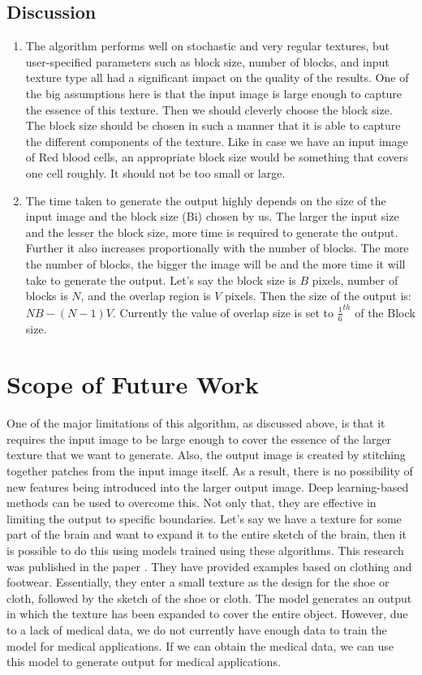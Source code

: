 \documentclass[12pt,a4paper]{report}
\begin{document}
\section{Discussion}
\begin{enumerate}
  \item The algorithm performs well on stochastic and very regular textures, but user-specified parameters such as block size, number of blocks, and input texture type all had a significant impact on the quality of the results. One of the big assumptions here is that the input image is large enough to capture the essence of this texture. Then we should cleverly choose the block size. The block size should be chosen in such a manner that it is able to capture the different components of the texture. Like in case we have an input image of Red blood cells, an appropriate block size would be something that covers one cell roughly. It should not be too small or large.
  \item The time taken to generate the output highly depends on the size of the input image and the block size (Bi) chosen by us. The larger the input size and the lesser the block size, more time is required to generate the output. Further it also increases proportionally with the number of blocks. The more the number of blocks, the bigger the image will be and the more time it will take to generate the output. Let's say the block size is $B$ pixels, number of blocks is $N$, and the overlap region is $V$ pixels. Then the size of the output is: $NB - (N-1)V$. Currently the value of overlap size is set to $\frac{1}{6}^{th}$ of the Block size.
\end{enumerate}


\chapter{Scope of Future Work}

One of the major limitations of this algorithm, as discussed above, is that it requires the input image to be large enough to cover the essence of the larger texture that we want to generate. Also, the output image is created by stitching together patches from the input image itself. As a result, there is no possibility of new features being introduced into the larger output image. Deep learning-based methods can be used to overcome this. Not only that, they are effective in limiting the output to specific boundaries. Let's say we have a texture for some part of the brain and want to expand it to the entire sketch of the brain, then it is possible to do this using models trained using these algorithms. This research was published in the paper \cite[TextureGAN: Controlling Deep Image Synthesis with Texture Patches]{b2}. They have provided examples based on clothing and footwear. Essentially, they enter a small texture as the design for the shoe or cloth, followed by the sketch of the shoe or cloth. The model generates an output in which the texture has been expanded to cover the entire object. However, due to a lack of medical data, we do not currently have enough data to train the model for medical applications. If we can obtain the medical data, we can use this model to generate output for medical applications.
\end{document}
